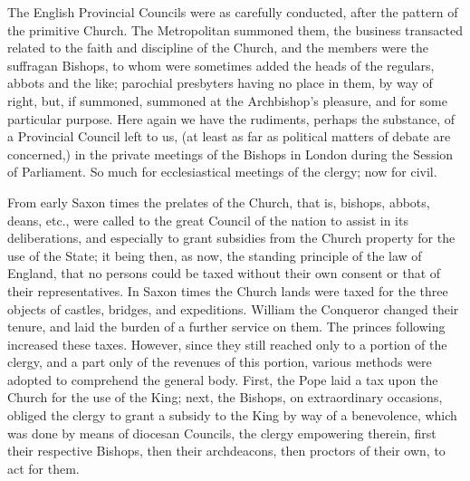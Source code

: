 The English Provincial
Councils were as carefully conducted, after the pattern of the
primitive Church. The Metropolitan summoned them, the business
transacted related to the faith and discipline of the Church, and the
members were the suffragan Bishops, to whom were sometimes added the
heads of the regulars, abbots and the like; parochial presbyters
having no place in them, by way of right, but, if summoned, summoned
at the Archbishop's pleasure, and for some particular purpose. Here
again we have the rudiments, perhaps the substance, of a Provincial
Council left to us, (at least as far as political matters of debate
are concerned,) in the private meetings of the Bishops in London
during the Session of Parliament. So much for ecclesiastical meetings
of the clergy; now for civil.

From early Saxon times the
prelates of the Church, that is, bishops, abbots, deans, etc., were
called to the great Council of the nation to assist in its
deliberations, and especially to grant subsidies from the Church
property for the use of the State; it being then, as now, the standing
principle of the law of England, that no persons could be taxed
without their own consent or that of their representatives. In Saxon
times the Church lands were taxed for the three objects of castles,
bridges, and expeditions. William the Conqueror changed their tenure,
and laid the burden of a further service on them. The princes
following increased these taxes. However, since they still
reached only to a portion of the clergy, and a part only of the
revenues of this portion, various methods were adopted to comprehend
the general body. First, the Pope laid a tax upon the Church for the
use of the King; next, the Bishops, on extraordinary occasions,
obliged the clergy to grant a subsidy to the King by way of a
benevolence, which was done by means of diocesan Councils, the clergy
empowering therein, first their respective Bishops, then their
archdeacons, then proctors of their own, to act for them.

